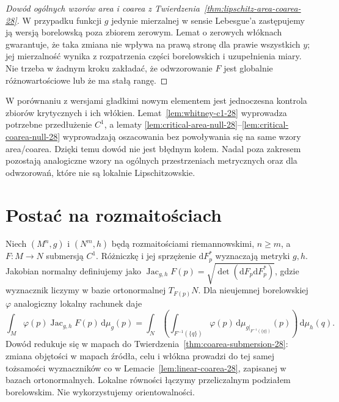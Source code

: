 \begin{proof}[Dowód ogólnych wzorów area i coarea z
Twierdzenia~\ref{thm:lipschitz-area-coarea-28}]
W przypadku funkcji $g$ jedynie mierzalnej
w sensie Lebesgue'a zastępujemy ją wersją
borelowską poza zbiorem zerowym. Lemat o
zerowych włóknach gwarantuje, że taka zmiana
nie wpływa na prawą stronę dla prawie wszystkich
$y$; jej mierzalność wynika z rozpatrzenia
części borelowskich i uzupełnienia miary.
Nie trzeba w żadnym kroku zakładać, że odwzorowanie
$F$ jest globalnie różnowartościowe lub że ma
stałą rangę.
\end{proof}

\begin{uwaga}
W porównaniu z wersjami gładkimi nowym elementem
jest jednoczesna kontrola zbiorów krytycznych i ich
włókien. Lemat~\ref{lem:whitney-c1-28} wyprowadza
potrzebne przedłużenie $C^1$, a lematy
\ref{lem:critical-area-null-28}--\ref{lem:critical-coarea-null-28}
wyprowadzają oszacowania bez powoływania się na
same wzory area/coarea. Dzięki temu dowód nie jest
błędnym kołem. Nadal poza zakresem pozostają
analogiczne wzory na ogólnych przestrzeniach
metrycznych oraz dla odwzorowań, które nie są
lokalnie Lipschitzowskie.
\end{uwaga}

\section{Postać na rozmaitościach}
Niech $(M^n,g)$ i $(N^m,h)$ będą rozmaitościami
riemannowskimi, $n\ge m$, a $F:M\to N$
submersją $C^1$. Różniczkę i jej sprzężenie
$\mathrm dF_p^*$ wyznaczają metryki $g,h$.
Jakobian normalny definiujemy jako
$\operatorname{Jac}_{g,h}F(p)=
\sqrt{\det(\mathrm dF_p\mathrm dF_p^*)}$,
gdzie wyznacznik liczymy w bazie ortonormalnej
$T_{F(p)}N$. Dla nieujemnej borelowskiej $\varphi$
analogiczny lokalny rachunek daje
\begin{equation}\label{eq:coarea-manifolds-28}
 \int_M\varphi(p)\operatorname{Jac}_{g,h}F(p)
 \,\mathrm d\mu_g(p)
 =\int_N\left(\int_{F^{-1}(\{q\})}\varphi(p)
 \,\mathrm d\mu_{g|_{F^{-1}(\{q\})}}(p)\right)
 \,\mathrm d\mu_h(q).
\end{equation}
Dowód redukuje się w mapach do
Twierdzenia~\ref{thm:coarea-submersion-28}:
zmiana objętości w mapach źródła, celu i włókna
prowadzi do tej samej tożsamości wyznaczników
co w Lemacie~\ref{lem:linear-coarea-28}, zapisanej
w bazach ortonormalnych. Lokalne równości
łączymy przeliczalnym podziałem borelowskim.
Nie wykorzystujemy orientowalności.

